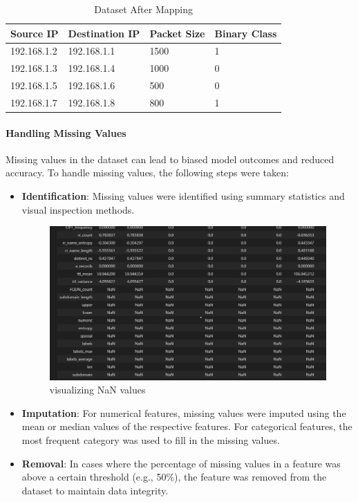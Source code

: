 \begin{table}[ht!]
\centering
\begin{tabular}{@{}llll@{}}
\toprule
Source IP   & Destination IP & Packet Size & Binary Class \\ \midrule
192.168.1.2 & 192.168.1.1    & 1500        & 1            \\
192.168.1.3 & 192.168.1.4    & 1000        & 0            \\
192.168.1.5 & 192.168.1.6    & 500         & 0            \\
192.168.1.7 & 192.168.1.8    & 800         & 1            \\ \bottomrule
\end{tabular}
\caption{Dataset After Mapping}
\label{tab:after_mapping}
\end{table}


\paragraph{Handling Missing Values}
Missing values in the dataset can lead to biased model outcomes and reduced accuracy. To handle missing values, the following steps were taken:
\begin{itemize}
    \item \textbf{Identification}: Missing values were identified using summary statistics and visual inspection methods.



    \begin{figure}[ht!]
        \centering
        \includegraphics[width=0.5\linewidth]{chap3/images/correlation for data cleaning.png}
        \caption{visualizing NaN values}
        \label{fig:enter-label}
    \end{figure}
    \item \textbf{Imputation}: For numerical features, missing values were imputed using the mean or median values of the respective features. For categorical features, the most frequent category was used to fill in the missing values.
    \item \textbf{Removal}: In cases where the percentage of missing values in a feature was above a certain threshold (e.g., 50\%), the feature was removed from the dataset to maintain data integrity.
\end{itemize}
